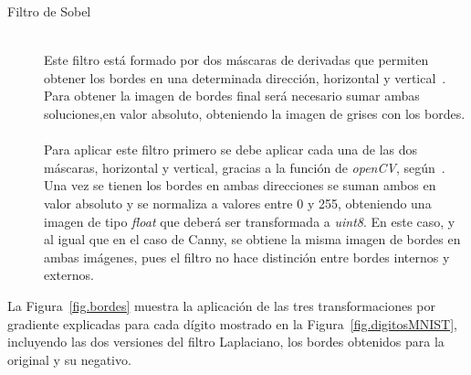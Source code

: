\begin{description}
	\vspace{10pt}
	\item[Filtro de Sobel] \hfill 
	\vspace{5pt}
	\\
	Este filtro está formado por dos máscaras de derivadas  que permiten obtener los bordes en una determinada dirección, horizontal y vertical~\cite{gonzalez2008digital}. Para obtener la imagen de bordes final será necesario sumar ambas soluciones,en valor absoluto, obteniendo la imagen de grises con los bordes.\\
	\vspace{-10pt}
	\\
	Para aplicar este filtro primero se debe aplicar cada una de las dos máscaras, horizontal y vertical, gracias a la función de \textit{openCV}, según~\cite{sobelOCV}. Una vez se tienen los bordes en ambas direcciones se suman ambos en valor absoluto y se normaliza a valores entre 0 y 255, obteniendo una imagen de tipo \textit{float} que deberá ser transformada a \textit{uint8}. En este caso, y al igual que en el caso de Canny, se obtiene la misma imagen de bordes en ambas imágenes, pues el filtro no hace distinción entre bordes internos y externos.	
\end{description}

La Figura~\ref{fig.bordes} muestra la aplicación de las tres transformaciones por gradiente explicadas para cada dígito mostrado en la Figura~\ref{fig.digitosMNIST}, incluyendo las dos versiones del filtro Laplaciano, los bordes obtenidos para la original y su negativo.

